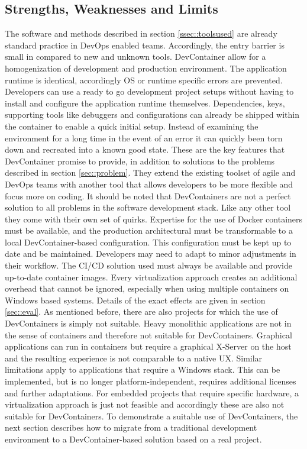     \subsection{Strengths, Weaknesses and Limits}\label{ssec::limits}
    The software and methods described in section \ref{ssec::toolsused} are already standard practice in DevOps enabled teams. Accordingly, the entry barrier is small in compared to new and unknown tools. DevContainer allow for a homogenization of development and production environment. The application runtime is identical, accordingly \ac{OS} or runtime specific errors are prevented. Developers can use a ready to go development project setups without having to install and configure the application runtime themselves. Dependencies, keys, supporting tools like debuggers and configurations can already be shipped within the container to enable a quick initial setup. Instead of examining the environment for a long time in the event of an error it can quickly been torn down and recreated into a known good state. These are the key features that DevContainer promise to provide, in addition to solutions to the problems described in section \ref{sec::problem}. They extend the existing toolset of agile and DevOps teams with another tool that allows developers to be more flexible and focus more on coding.\newline
    It should be noted that DevContainers are not a perfect solution to all problems in the software development stack. Like any other tool they come with their own set of quirks. Expertise for the use of Docker containers must be available, and the production architectural must be transformable to a local DevContainer-based configuration. This configuration must be kept up to date and be maintained. Developers may need to adapt to minor adjustments in their workflow. The \ac{CI}/\ac{CD} solution used must always be available and provide up-to-date container images. Every virtualization approach creates an additional overhead that cannot be ignored, especially when using multiple containers on Windows based systems. Details of the exact effects are given in section \ref{sec::eval}.\newline
    As mentioned before, there are also projects for which the use of DevContainers is simply not suitable. Heavy monolithic applications are not in the sense of containers and therefore not suitable for DevContainers. Graphical applications can run in containers but require a graphical X-Server on the host and the resulting experience is not comparable to a native \ac{UX}. Similar limitations apply to applications that require a Windows stack. This can be implemented, but is no longer platform-independent, requires additional licenses and further adaptations. For embedded projects that require specific hardware, a virtualization approach is just not feasible and accordingly these are also not suitable for DevContainers.\newline
    To demonstrate a suitable use of DevContainers, the next section describes how to migrate from a traditional development environment to a DevContainer-based solution based on a real project.

